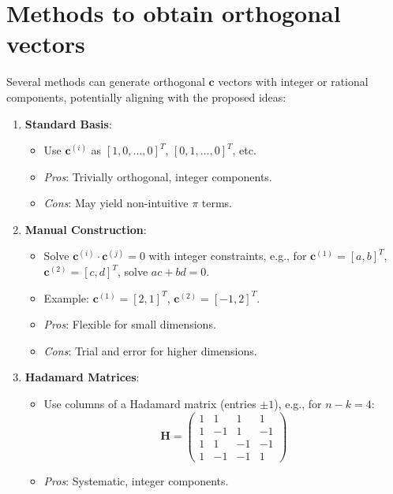 \section{Methods to obtain orthogonal vectors}
Several methods can generate orthogonal $\mathbf{c}$ vectors with integer or rational components, potentially aligning with the proposed ideas:
\begin{enumerate}
    \item \textbf{Standard Basis}:
        \begin{itemize}
            \item Use $\mathbf{c}^{(i)}$ as $[1, 0, \ldots, 0]^T$, $[0, 1, \ldots, 0]^T$, etc.
            \item \textit{Pros}: Trivially orthogonal, integer components.
            \item \textit{Cons}: May yield non-intuitive $\pi$ terms.
        \end{itemize}
    \item \textbf{Manual Construction}:
        \begin{itemize}
            \item Solve $\mathbf{c}^{(i)} \cdot \mathbf{c}^{(j)} = 0$ with integer constraints, e.g., for $\mathbf{c}^{(1)} = [a, b]^T$, $\mathbf{c}^{(2)} = [c, d]^T$, solve $a c + b d = 0$.
            \item Example: $\mathbf{c}^{(1)} = [2, 1]^T$, $\mathbf{c}^{(2)} = [-1, 2]^T$.
            \item \textit{Pros}: Flexible for small dimensions.
            \item \textit{Cons}: Trial and error for higher dimensions.
        \end{itemize}
    \item \textbf{Hadamard Matrices}:
        \begin{itemize}
            \item Use columns of a Hadamard matrix (entries $\pm 1$), e.g., for $n - k = 4$:
            \[
            \mathbf{H} = \begin{pmatrix}
                1 & 1 & 1 & 1 \\
                1 & -1 & 1 & -1 \\
                1 & 1 & -1 & -1 \\
                1 & -1 & -1 & 1
            \end{pmatrix}
            \]
            \item \textit{Pros}: Systematic, integer components.

\end{itemize}
\end{enumerate}

